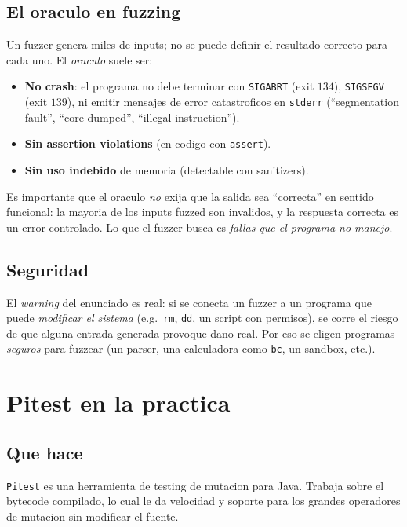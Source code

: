\documentclass[12pt,a4paper]{article}
\begin{document}
\subsection{El oraculo en fuzzing}

Un fuzzer genera miles de inputs; no se puede definir el resultado correcto para cada uno. El
\emph{oraculo} suele ser:

\begin{itemize}
  \item \textbf{No crash}: el programa no debe terminar con \texttt{SIGABRT} (exit $134$),
  \texttt{SIGSEGV} (exit $139$), ni emitir mensajes de error catastroficos en \texttt{stderr}
  (``segmentation fault'', ``core dumped'', ``illegal instruction'').
  \item \textbf{Sin assertion violations} (en codigo con \texttt{assert}).
  \item \textbf{Sin uso indebido} de memoria (detectable con sanitizers).
\end{itemize}

\begin{ideabox}
Es importante que el oraculo \emph{no} exija que la salida sea ``correcta'' en sentido
funcional: la mayoria de los inputs fuzzed son invalidos, y la respuesta correcta es un error
controlado. Lo que el fuzzer busca es \emph{fallas que el programa no manejo}.
\end{ideabox}

\subsection{Seguridad}

El \emph{warning} del enunciado es real: si se conecta un fuzzer a un programa que puede
\emph{modificar el sistema} (e.g.\ \texttt{rm}, \texttt{dd}, un script con permisos), se corre
el riesgo de que alguna entrada generada provoque dano real. Por eso se eligen programas
\emph{seguros} para fuzzear (un parser, una calculadora como \texttt{bc}, un sandbox, etc.).

\section{Pitest en la practica}

\subsection{Que hace}

\texttt{Pitest} es una herramienta de testing de mutacion para Java. Trabaja sobre el bytecode
compilado, lo cual le da velocidad y soporte para los grandes operadores de mutacion sin
modificar el fuente.
\end{document}

